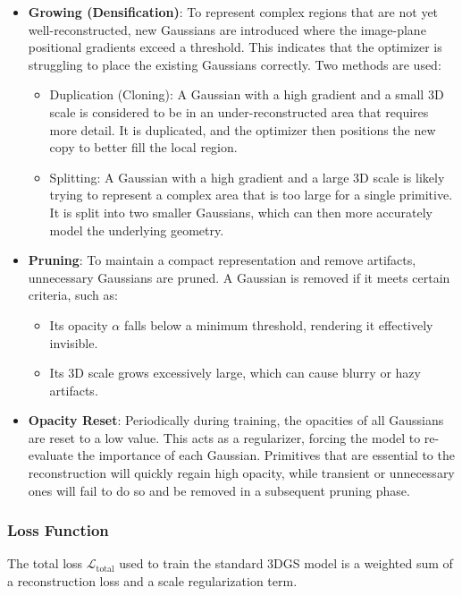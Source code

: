 \begin{itemize}
	\item \textbf{Growing (Densification)}:
	      To represent complex regions that are not yet well-reconstructed, new Gaussians are introduced where the image-plane positional gradients exceed a threshold. This indicates that the optimizer is struggling to place the existing Gaussians correctly. Two methods are used:
	      \begin{itemize}
		      \item Duplication (Cloning): A Gaussian with a high gradient and a small 3D scale is considered to be in an under-reconstructed area that requires more detail. It is duplicated, and the optimizer then positions the new copy to better fill the local region.
		      \item Splitting: A Gaussian with a high gradient and a large 3D scale is likely trying to represent a complex area that is too large for a single primitive. It is split into two smaller Gaussians, which can then more accurately model the underlying geometry.
	      \end{itemize}

	\item \textbf{Pruning}:
	      To maintain a compact representation and remove artifacts, unnecessary Gaussians are pruned. A Gaussian is removed if it meets certain criteria, such as:
	      \begin{itemize}
		      \item Its opacity $\alpha$ falls below a minimum threshold, rendering it effectively invisible.
		      \item Its 3D scale grows excessively large, which can cause blurry or hazy artifacts.
	      \end{itemize}

	\item \textbf{Opacity Reset}:
	      Periodically during training, the opacities of all Gaussians are reset to a low value. This acts as a regularizer, forcing the model to re-evaluate the importance of each Gaussian. Primitives that are essential to the reconstruction will quickly regain high opacity, while transient or unnecessary ones will fail to do so and be removed in a subsequent pruning phase.
\end{itemize}

\subsubsection{Loss Function}
The total loss $\mathcal{L}_{\text{total}}$ used to train the standard 3DGS model is a weighted sum of a reconstruction loss and a scale regularization term.

